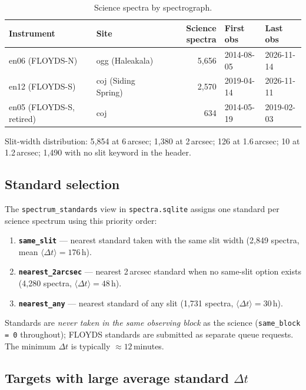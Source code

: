 \documentclass[12pt,a4paper]{article}
\begin{document}
\begin{table}[h!]
\centering
\small
\begin{tabular}{llrll}
\toprule
Instrument & Site & Science spectra & First obs & Last obs \\
\midrule
en06 (FLOYDS-N) & ogg (Haleakala)     & 5{,}656 & 2014-08-05 & 2026-11-14 \\
en12 (FLOYDS-S) & coj (Siding Spring) & 2{,}570 & 2019-04-14 & 2026-11-11 \\
en05 (FLOYDS-S, retired) & coj        &   634   & 2014-05-19 & 2019-02-03 \\
\bottomrule
\end{tabular}
\caption{Science spectra by spectrograph.}
\end{table}

Slit-width distribution: 5{,}854 at 6\,arcsec; 1{,}380 at 2\,arcsec;
126 at 1.6\,arcsec; 10 at 1.2\,arcsec; 1{,}490 with no slit keyword in the
header.

\subsection{Standard selection}

The \texttt{spectrum\_standards} view in \texttt{spectra.sqlite} assigns one
standard per science spectrum using this priority order:

\begin{enumerate}
  \item \textbf{\texttt{same\_slit}} --- nearest standard taken with the same
        slit width (2{,}849 spectra, mean $\langle\Delta t\rangle = 176$\,h).
  \item \textbf{\texttt{nearest\_2arcsec}} --- nearest 2\,arcsec standard when
        no same-slit option exists (4{,}280 spectra, $\langle\Delta t\rangle =
        48$\,h).
  \item \textbf{\texttt{nearest\_any}} --- nearest standard of any slit
        (1{,}731 spectra, $\langle\Delta t\rangle = 30$\,h).
\end{enumerate}

Standards are \emph{never taken in the same observing block} as the science
(\texttt{same\_block = 0} throughout); FLOYDS standards are submitted as
separate queue requests.  The minimum $\Delta t$ is typically $\approx
12$\,minutes.

\subsection{Targets with large average standard $\Delta t$}
\label{sec:std-dt}
\end{document}
